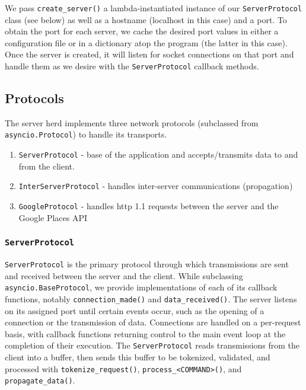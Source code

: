 \documentclass[letterpaper,twocolumn,10pt]{article}
\begin{document}
We pass \texttt{create\_server()} a lambda-instantiated instance of our \texttt{ServerProtocol} class (see below) as well as a hostname (localhost in this case) and a port. To obtain the port for each server, we cache the desired port values in either a configuration file or in a dictionary atop the program (the latter in this case). Once the server is created, it will listen for socket connections on that port and handle them as we desire with the \texttt{ServerProtocol} callback methods.

\subsection{Protocols}

The server herd implements three network protocols (subclassed from \texttt{asyncio.Protocol}) to handle its transports. 



\begin{enumerate}
	\item \texttt{ServerProtocol} - base of the application and accepts/transmits data to and from the client. 
	\item \texttt{InterServerProtocol} - handles inter-server communications (propagation)
	\item \texttt{GoogleProtocol} - handles http 1.1 requests between the server and the Google Places API
\end{enumerate}

\subsubsection{\texttt{ServerProtocol}}

\texttt{ServerProtocol} is the primary protocol through which transmissions are sent and received between the server and the client. While subclassing \texttt{asyncio.BaseProtocol}, we provide implementations of each of its callback functions, notably \texttt{connection\_made()} and \texttt{data\_received()}. The server listens on its assigned port until certain events occur, such as the opening of a connection or the transmission of data. Connections are handled on a per-request basis, with callback functions returning control to the main event loop at the completion of their execution. The \texttt{ServerProtocol} reads transmissions from the client into a buffer, then sends this buffer to be tokenized, validated, and processed with \texttt{tokenize\_request()}, \texttt{process\_<COMMAND>()}, and \texttt{propagate\_data()}.
\end{document}
